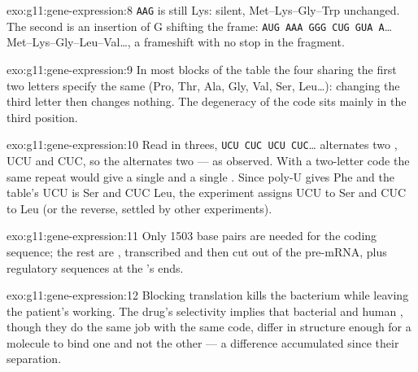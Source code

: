 \begin{solution}{exo:g11:gene-expression:8}
\texttt{AAG} is still Lys: silent, Met--Lys--Gly--Trp unchanged. The
second is an insertion of G shifting the frame: \texttt{AUG AAA GGG
CUG GUA A}\dots{} Met--Lys--Gly--Leu--Val\dots, a frameshift with no
stop in the fragment.
\end{solution}

\begin{solution}{exo:g11:gene-expression:9}
In most blocks of the table the four  sharing the first two
letters specify the same  (Pro, Thr, Ala, Gly, Val, Ser,
Leu\dots): changing the third letter then changes nothing. The
degeneracy of the code sits mainly in the third position.
\end{solution}

\begin{solution}{exo:g11:gene-expression:10}
Read in threes, \texttt{UCU CUC UCU CUC}\dots{} alternates two ,
UCU and CUC, so the  alternates two  --- as
observed. With a two-letter code the same repeat would give a single
 and a single . Since poly-U gives Phe and the table's
UCU is Ser and CUC Leu, the experiment assigns UCU to Ser and CUC to
Leu (or the reverse, settled by other experiments).
\end{solution}

\begin{solution}{exo:g11:gene-expression:11}
Only 1503 base pairs are needed for the coding sequence; the rest are
, transcribed and then cut out of the pre-mRNA, plus
regulatory sequences at the 's ends.
\end{solution}

\begin{solution}{exo:g11:gene-expression:12}
Blocking translation kills the bacterium while leaving the patient's
 working. The drug's selectivity implies that bacterial and human
, though they do the same job with the same code, differ in
structure enough for a molecule to bind one and not the other --- a
difference accumulated since their separation.
\end{solution}

